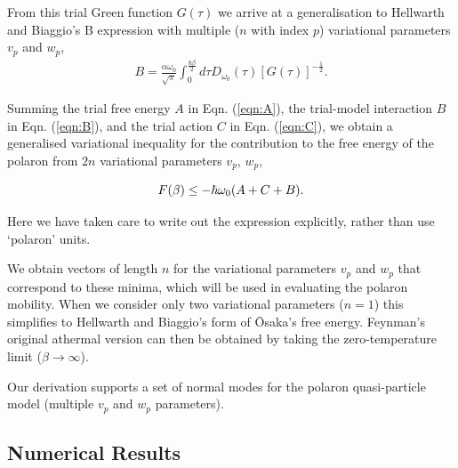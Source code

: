 From this trial Green function $G(\tau)$ we arrive at a generalisation to Hellwarth and Biaggio's B expression with multiple ($n$ with index $p$) variational parameters $v_{p}$ and $w_{p}$, 
\begin{equation}
\begin{gathered}
    B = \frac{\alpha \omega_0}{\sqrt{\pi}} \int_0^{\frac{\hbar\beta}{2}} d\tau D_{\omega_0}(\tau) \left[ G(\tau) \right]^{-\frac{1}{2}} .
\label{eqn:B}
\end{gathered}
\end{equation}

Summing the trial free energy $A$ in Eqn. (\ref{eqn:A}), the trial-model interaction $B$ in Eqn. (\ref{eqn:B}), and the trial action $C$ in Eqn. (\ref{eqn:C}), we obtain a generalised variational inequality for the contribution to the free energy of the polaron from $2n$ variational parameters $v_{p}$, $w_{p}$, 

\begin{equation}\label{eqn:multi_feynman_jensen}
        F(\beta) \leq - \hbar \omega_0 (A + C + B) . \\
\end{equation}

Here we have taken care to write out the expression explicitly, rather than use `polaron' units. 
\newline

We obtain vectors of length $n$ for the variational parameters $v_{p}$ and $w_{p}$ that correspond to these minima, which will be used in evaluating the polaron mobility. When we consider only two variational parameters ($n = 1$) this simplifies to Hellwarth and Biaggio's form of \=Osaka's free energy. Feynman's original athermal version can then be obtained by taking the zero-temperature limit ($\beta \rightarrow \infty$).
\newline

Our derivation supports a set of normal modes for the polaron quasi-particle model (multiple $v_{p}$ and $w_{p}$ parameters).

\subsection{Numerical Results}

